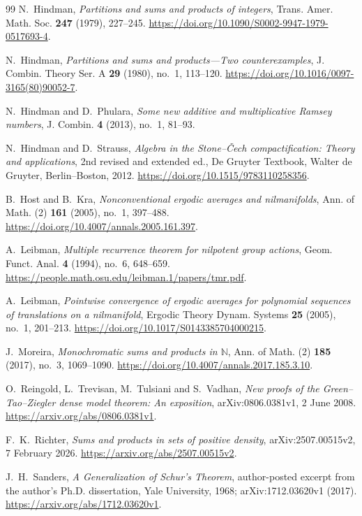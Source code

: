 \begin{thebibliography}{99}
N.~Hindman,
\emph{Partitions and sums and products of integers},
Trans. Amer. Math. Soc. \textbf{247} (1979), 227--245.
\url{https://doi.org/10.1090/S0002-9947-1979-0517693-4}.

N.~Hindman,
\emph{Partitions and sums and products---Two counterexamples},
J. Combin. Theory Ser. A \textbf{29} (1980), no.~1, 113--120.
\url{https://doi.org/10.1016/0097-3165(80)90052-7}.

N.~Hindman and D.~Phulara,
\emph{Some new additive and multiplicative Ramsey numbers},
J. Combin. \textbf{4} (2013), no.~1, 81--93.

N.~Hindman and D.~Strauss,
\emph{Algebra in the Stone--\v{C}ech compactification: Theory and applications},
2nd revised and extended ed., De Gruyter Textbook,
Walter de Gruyter, Berlin--Boston, 2012.
\url{https://doi.org/10.1515/9783110258356}.

B.~Host and B.~Kra,
\emph{Nonconventional ergodic averages and nilmanifolds},
Ann. of Math. (2) \textbf{161} (2005), no.~1, 397--488.
\url{https://doi.org/10.4007/annals.2005.161.397}.

A.~Leibman,
\emph{Multiple recurrence theorem for nilpotent group actions},
Geom. Funct. Anal. \textbf{4} (1994), no.~6, 648--659.
\url{https://people.math.osu.edu/leibman.1/papers/tmr.pdf}.

A.~Leibman,
\emph{Pointwise convergence of ergodic averages for polynomial sequences of translations on a nilmanifold},
Ergodic Theory Dynam. Systems \textbf{25} (2005), no.~1, 201--213.
\url{https://doi.org/10.1017/S0143385704000215}.

J.~Moreira,
\emph{Monochromatic sums and products in $\mathbb{N}$},
Ann. of Math. (2) \textbf{185} (2017), no.~3, 1069--1090.
\url{https://doi.org/10.4007/annals.2017.185.3.10}.

O.~Reingold, L.~Trevisan, M.~Tulsiani and S.~Vadhan,
\emph{New proofs of the Green--Tao--Ziegler dense model theorem: An exposition},
arXiv:0806.0381v1, 2 June 2008.
\url{https://arxiv.org/abs/0806.0381v1}.

F.~K.~Richter,
\emph{Sums and products in sets of positive density},
arXiv:2507.00515v2, 7 February 2026.
\url{https://arxiv.org/abs/2507.00515v2}.

J.~H.~Sanders,
\emph{A Generalization of Schur's Theorem},
author-posted excerpt from the author's Ph.D. dissertation,
Yale University, 1968; arXiv:1712.03620v1 (2017).
\url{https://arxiv.org/abs/1712.03620v1}.


\end{thebibliography}
